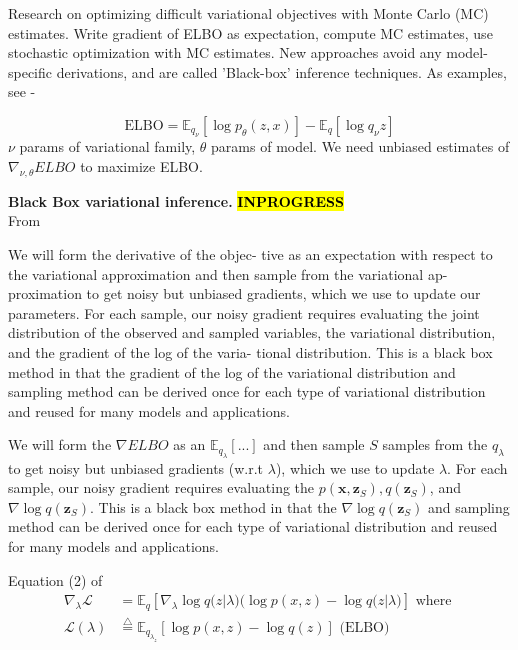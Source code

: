\documentclass[letterpaper]{article}
\newcommand{\INPROGRESS}{\sethlcolor{cyan}\hl{\textbf{INPROGRESS}}\sethlcolor{yellow}}
\newcommand{\red}[1]{\textcolor{BrickRed}{#1}}
\newcommand{\bx}{\mathbf{x}}
\newcommand{\bz}{\mathbf{z}}
\newcommand{\EEE}[2]{\mathbb{E}_{#1}\left[#2\right]}
\newcommand{\mypar}[1]{{\bf #1.}}
\begin{document}
  Research on optimizing difficult variational objectives with Monte Carlo (MC)
  estimates. Write gradient of ELBO as expectation, compute MC estimates, use stochastic
  optimization with MC estimates. New approaches avoid any model-specific derivations,
  and are called 'Black-box' inference techniques. As examples, see - \cite{kingma2013auto}
  \cite{rezende2014stochastic} \cite{ranganath2014black} \cite{ranganath2016hierarchical}
  \cite{titsias2014doubly} \cite{kucukelbir2017automatic}

  $$
    \text{ELBO} = \EEE{q_{\nu}}{\log p_{\theta}(z, x)} - \EEE{q}{\log q_{\nu}{z}}
  $$
  $\nu$ params of variational family, $\theta$ params of model. We need unbiased estimates
  of $\nabla_{\nu, \theta}ELBO$ to maximize ELBO.
  
  \mypar{Black Box variational inference} \INPROGRESS \\
    From \cite{ranganath2014black}
    \begin{displayquote}
      We will form the derivative of the objec-
      tive as an expectation with respect to the variational
      approximation and then sample from the variational ap-
      proximation to get noisy but unbiased gradients, which
      we use to update our parameters. For each sample, our
      noisy gradient requires evaluating the joint distribution
      of the observed and sampled variables, the variational
      distribution, and the gradient of the log of the varia-
      tional distribution. This is a black box method in that
      the gradient of the log of the variational distribution
      and sampling method can be derived once for each type
      of variational distribution and reused for many models
      and applications.
    \end{displayquote}
    \begin{displayquote}
       \red{We will form the $\nabla ELBO$ as an $\EEE{q_\lambda}{...}$ 
       and then sample $S$ samples from the $q_\lambda$ to get noisy but unbiased gradients (w.r.t $\lambda$), which
       we use to update $\lambda$. For each sample, our
       noisy gradient requires evaluating the $p(\bx, \bz_{S}), q(\bz_{S})$, and
        $\nabla \log q(\bz_{S})$. This is a black box method in that
       the $\nabla \log q(\bz_{S})$
       and sampling method can be derived once for each type
       of variational distribution and reused for many models
       and applications.}
    \end{displayquote}
  Equation (2) of \cite{ranganath2014black}
  \begin{align}
    \nabla_{\lambda}\mathcal{L} &= \EEE{q}{\nabla_{\lambda}\log q(z|\lambda) \Big(\log p(x, z) - \log q(z|\lambda\Big)} \label{eqn:bbvi_grad} \text{ where } \\
    \mathcal{L}(\lambda) &\overset{\triangle}{=}  \EEE{q_{\lambda_{z}}}{\log p(x, z) - \log q(z)} \text{ (ELBO) } \nonumber
  \end{align}
\end{document}
